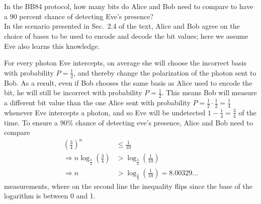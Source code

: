 \section{}

In the BB84 protocol, how many bits do Alice and Bob need to compare to have a 90 percent chance of detecting
Eve's presence? \\

{\Sol}
In the scenario presented in Sec.~2.4 of the text, Alice and Bob agree on the choice of bases to be used
to encode and decode the bit values;
here we assume Eve also learns this knowledge.

For every photon Eve intercepts, on average she will choose the incorrect basis with probability $P = \tfrac{1}{2}$, and
thereby change the polarization of the photon sent to Bob.
As a result, even if Bob chooses the same basis as Alice used to encode the bit, he will still be incorrect
with probability $P = \tfrac{1}{2}$.
This means Bob will measure a different bit value than the one Alice sent with probability $P = \tfrac{1}{2} \cdot \tfrac{1}{2} = \tfrac{1}{4}$
whenever Eve intercepts a photon, and so Eve will be undetected $1 - \tfrac{1}{4} = \tfrac{3}{4}$ of the time.
To ensure a 90\% chance of detecting eve's presence, Alice and Bob need to compare
\begin{align*}
    \left (\tfrac{3}{4} \right )^n &\leq \tfrac{1}{10} \\
    \Rightarrow n \log_{\tfrac{3}{4}} \left (\tfrac{3}{4} \right ) &> \log_{\tfrac{3}{4}} \left (\tfrac{1}{10} \right ) \\
    \Rightarrow n &> \log_{\tfrac{3}{4}} \left (\tfrac{1}{10} \right ) = 8.00329\ldots
\end{align*}
measurements, where on the second line the inequality flips since the base of the logarithm is between 0 and 1.
